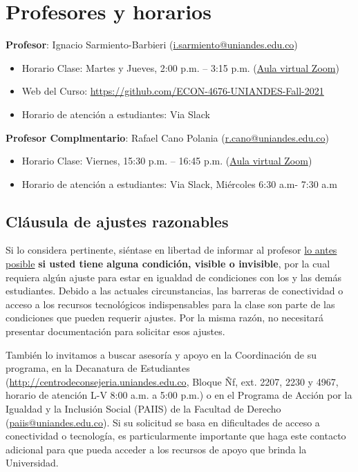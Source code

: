 \documentclass[11pt]{article}
\begin{document}
\section{Profesores y horarios} 

{\bf Profesor}: Ignacio Sarmiento-Barbieri (\href{mailto:i.sarmiento@uniandes.edu.co}{i.sarmiento@uniandes.edu.co})
\begin{itemize}
  \item Horario Clase: Martes y Jueves, 2:00 p.m. – 3:15 p.m. (\href{}{Aula virtual Zoom})
  \item Web del Curso: \url{https://github.com/ECON-4676-UNIANDES-Fall-2021}
\item Horario de atención a estudiantes: Via Slack 
\end{itemize}

{\bf Profesor Complmentario}: Rafael Cano Polania (\href{mailto:r.cano@uniandes.edu.co}{r.cano@uniandes.edu.co})
\begin{itemize}
	\item Horario Clase: Viernes, 15:30 p.m. – 16:45 p.m. (\href{}{Aula virtual Zoom})
	\item Horario de atención a estudiantes: Via Slack, Miércoles 6:30 a.m- 7:30 a.m
\end{itemize}


\subsection*{Cláusula de ajustes razonables}

Si lo considera pertinente, siéntase en libertad de informar al profesor \underline{lo antes posible} {\bf si usted tiene alguna condición, visible o invisible}, por la cual requiera algún ajuste para estar en igualdad de condiciones con los y las demás estudiantes. Debido a las actuales circunstancias, las barreras de conectividad o acceso a los recursos tecnológicos indispensables para la clase son parte de las condiciones que pueden requerir ajustes. Por la misma razón, no necesitará presentar documentación para solicitar esos ajustes. 

También lo invitamos a buscar asesoría y apoyo en la Coordinación de su programa, en la Decanatura de Estudiantes (\url{http://centrodeconsejeria.uniandes.edu.co}, Bloque Ñf, ext. 2207, 2230 y 4967, horario de atención L-V 8:00 a.m. a 5:00 p.m.) o en el Programa de Acción por la Igualdad y la Inclusión Social (PAIIS) de la Facultad de Derecho (\href{mailto:paiis@uniandes.edu.co}{paiis@uniandes.edu.co}). Si su solicitud se basa en dificultades de acceso a conectividad o tecnología, es particularmente importante que haga este contacto adicional para que pueda acceder a los recursos de apoyo que brinda la Universidad. 
\end{document}
